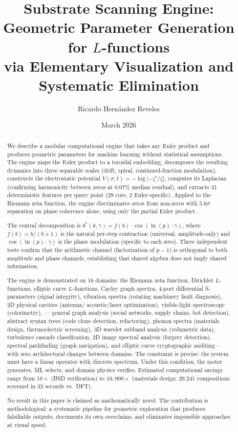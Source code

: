 \documentclass[11pt]{amsart}
\title[Substrate Scanning Engine]{Substrate Scanning Engine:\\
  Geometric Parameter Generation for $L$-functions\\
  via Elementary Visualization and Systematic Elimination}
\author{Ricardo Hern\'andez Reveles}
\date{March 2026}
\begin{document}
\begin{abstract}
We describe a modular computational engine that takes any Euler product and
produces geometric parameters for machine learning without statistical
assumptions. The engine maps the Euler product to a toroidal embedding,
decomposes the resulting dynamics into three separable scales (drift, spiral,
continued-fraction modulation), constructs the electrostatic potential
$V(\sigma,t) = -\log\lvert -\zeta'/\zeta \rvert$, computes its Laplacian
(confirming harmonicity between zeros at $0.07\%$ median residual), and
extracts 31 deterministic features per query point (29 core, 2 Euler-specific). Applied to the Riemann
zeta function, the engine discriminates zeros from non-zeros with $5.6\sigma$
separation on phase coherence alone, using only the partial Euler product.

The central decomposition is
$\theta^*(k,\gamma) = f(b)\cdot\cos(\ln(p)\cdot\gamma)$, where
$f(b) = b/(b+1)$ is the natural per-step contraction (universal,
amplitude-only) and $\cos(\ln(p)\cdot\gamma)$ is the phase modulation
(specific to each zero). Three independent tests confirm that the arithmetic
channel (factorization of $p-1$) is orthogonal to both amplitude and phase
channels, establishing that shared algebra does not imply shared information.

The engine is demonstrated on 16 domains: the Riemann zeta function,
Dirichlet $L$-functions, elliptic curve $L$-functions, Cayley graph spectra,
4-port differential S-parameters (signal integrity), vibration spectra
(rotating machinery fault diagnosis), 2D physical cavities
(antenna/ acoustic/laser
optimization), visible-light spectroscopy
(colorimetry), --- general graph analysis (social networks, supply chains, bot
detection), abstract syntax trees (code clone detection, refactoring), phonon
spectra (materials design, thermoelectric screening), 3D wavelet subband
analysis (volumetric data), turbulence cascade classification, 2D image
spectral analysis (forgery detection), spectral pathfinding (graph
navigation), and elliptic curve cryptographic auditing---with zero
architectural changes between domains. The constraint is precise: the system
must have a linear operator with discrete spectrum. Under this condition, the
motor generates, ML selects, and domain physics verifies. Estimated
computational savings range from $10\times$ (BSD verification) to
$10{,}000\times$ (materials design: 29,241 compositions screened in 32
seconds vs.\ DFT).

No result in this paper is claimed as mathematically novel. The contribution
is methodological: a systematic pipeline for geometric exploration that
produces falsifiable outputs, documents its own overclaims, and eliminates
impossible approaches at visual speed.
\end{abstract}
\end{document}
